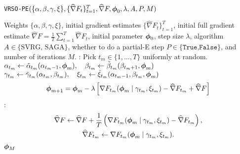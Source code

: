 \begin{algorithm}
\caption{\texttt{VRSO-PE}$(\{\alpha,\beta,\gamma,\xi\},\{\widehat \nabla F_t\}_{t=1}^T, \widehat \nabla F,\boldsymbol{\phi}_0,\lambda,A,P,M)$}\label{alg:VRSO-PE}
\begin{algorithmic}[1]
\Require Weights $\{\alpha,\beta,\gamma,\xi\}$, initial gradient estimates $\{\widehat \nabla F_t\}_{t=1}^T$, initial full gradient estimate $\widehat \nabla F = \frac{1}{T} \sum_{t=1}^T \widehat \nabla F_{t}$, initial parameter $\boldsymbol{\phi}_0$, step size $\lambda$, algorithm $A \in \{\text{SVRG, SAGA}\}$, whether to do a partial-E step $P \in \{\texttt{True,False}\}$, and number of iterations $M$.
%
\vspace{5pt}
%
:
    \State Pick $t_{m} \in \{1,\ldots,T\}$ uniformly at random.
     
    \State $\alpha_{t_m} \gets \tilde \alpha_{t_m}(\alpha_{t_m-1},\boldsymbol{\phi}_{m}), \quad \beta_{t_m} \gets \tilde \beta_{t_m}(\beta_{t_m+1},\boldsymbol{\phi}_{m})$ 
    \State $\gamma_{t_m} \gets \tilde \gamma_{t_m}(\alpha_{t_m},\beta_{t_m}), 
    \quad \xi_{t_m} \gets \tilde \xi_{t_m}(\alpha_{t_m-1},\beta_{t_m},\boldsymbol{\phi}_{m})$
    \EndIf
    \State {}
    \begin{gather}
        \boldsymbol{\phi}_{m+1} = \boldsymbol{\phi}_{m} - \lambda \left[\nabla F_{t_m}(\boldsymbol{\phi}_{m} \mid \gamma_{t_m}, \xi_{t_m}) - \widehat \nabla F_{t_{m}} + \widehat \nabla F \right]
        \label{eqn:SAGA_update0}
    \end{gather}
    :
        \begin{gather}
            \widehat \nabla F \gets \widehat \nabla F + \frac{1}{T} \left( \nabla F_{t_m}(\boldsymbol{\phi}_{m} \mid \gamma_{t_m}, \xi_{t_m}) - \widehat \nabla F_{t_{m}}\right), \\
            \widehat \nabla F_{t_{m}} \gets \nabla F_{t_m}(\boldsymbol{\phi}_{m} \mid \gamma_{t_m}, \xi_{t_m}).
        \end{gather}
    \EndIf
\EndFor
\State \Return $\boldsymbol{\phi}_M$
\end{algorithmic}
\end{algorithm}


